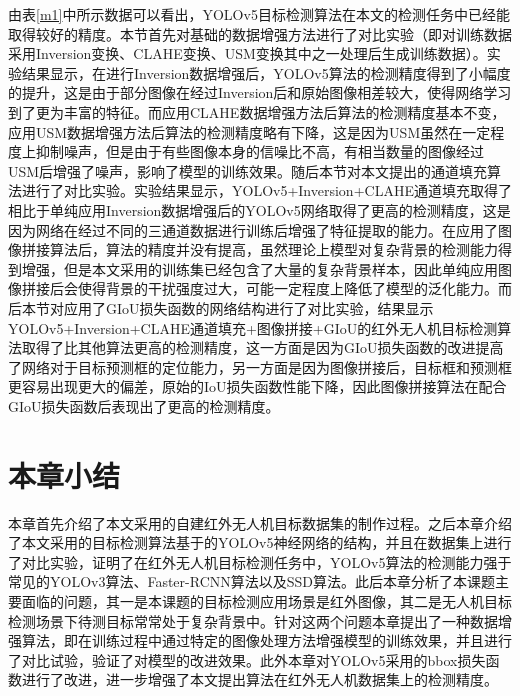 由表\ref{m1}中所示数据可以看出，YOLOv5目标检测算法在本文的检测任务中已经能取得较好的精度。本节首先对基础的数据增强方法进行了对比实验（即对训练数据采用Inversion变换、CLAHE变换、USM变换其中之一处理后生成训练数据）。实验结果显示，在进行Inversion数据增强后，YOLOv5算法的检测精度得到了小幅度的提升，这是由于部分图像在经过Inversion后和原始图像相差较大，使得网络学习到了更为丰富的特征。而应用CLAHE数据增强方法后算法的检测精度基本不变，应用USM数据增强方法后算法的检测精度略有下降，这是因为USM虽然在一定程度上抑制噪声，但是由于有些图像本身的信噪比不高，有相当数量的图像经过USM后增强了噪声，影响了模型的训练效果。随后本节对本文提出的通道填充算法进行了对比实验。实验结果显示，YOLOv5+Inversion+CLAHE通道填充取得了相比于单纯应用Inversion数据增强后的YOLOv5网络取得了更高的检测精度，这是因为网络在经过不同的三通道数据进行训练后增强了特征提取的能力。在应用了图像拼接算法后，算法的精度并没有提高，虽然理论上模型对复杂背景的检测能力得到增强，但是本文采用的训练集已经包含了大量的复杂背景样本，因此单纯应用图像拼接后会使得背景的干扰强度过大，可能一定程度上降低了模型的泛化能力。而后本节对应用了GIoU损失函数的网络结构进行了对比实验，结果显示YOLOv5+Inversion+CLAHE通道填充+图像拼接+GIoU的红外无人机目标检测算法取得了比其他算法更高的检测精度，这一方面是因为GIoU损失函数的改进提高了网络对于目标预测框的定位能力，另一方面是因为图像拼接后，目标框和预测框更容易出现更大的偏差，原始的IoU损失函数性能下降，因此图像拼接算法在配合GIoU损失函数后表现出了更高的检测精度。

\section{本章小结}
本章首先介绍了本文采用的自建红外无人机目标数据集的制作过程。之后本章介绍了本文采用的目标检测算法基于的YOLOv5神经网络的结构，并且在数据集上进行了对比实验，证明了在红外无人机目标检测任务中，YOLOv5算法的检测能力强于常见的YOLOv3算法、Faster-RCNN算法以及SSD算法。此后本章分析了本课题主要面临的问题，其一是本课题的目标检测应用场景是红外图像，其二是无人机目标检测场景下待测目标常常处于复杂背景中。针对这两个问题本章提出了一种数据增强算法，即在训练过程中通过特定的图像处理方法增强模型的训练效果，并且进行了对比试验，验证了对模型的改进效果。此外本章对YOLOv5采用的bbox损失函数进行了改进，进一步增强了本文提出算法在红外无人机数据集上的检测精度。









